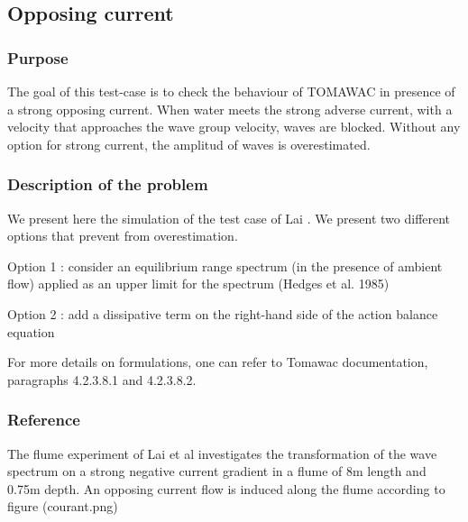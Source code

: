 \subsection{Opposing current}
%

%    
\subsubsection{Purpose}
%
The goal of this test-case is to check the behaviour of TOMAWAC in presence of a strong opposing current. When water meets the strong adverse current, with a velocity that approaches the wave group velocity, waves are blocked. Without any option for strong current, the amplitud of waves is overestimated.  

%
\subsubsection{Description of the problem}
%
We present here the simulation of the test case of Lai \cite{lai}. We present two different options that prevent from overestimation. 

Option 1 : consider an equilibrium range spectrum (in the presence of ambient flow) applied as an upper limit for the spectrum \cite{hedges} (Hedges et al. 1985) 

Option 2 : add a dissipative term on the right-hand side of the action balance equation \cite{Westhuysen_2012}

For more details on formulations, one can refer to Tomawac documentation, paragraphs 4.2.3.8.1 and 4.2.3.8.2. 

%
\subsubsection{Reference}
%
The flume experiment of Lai et al  \cite{lai} investigates the transformation of the wave spectrum on a strong negative current gradient in a flume of 8m length and 0.75m depth. An opposing current flow is induced along the flume according to figure (courant.png) 


%
%
